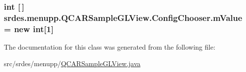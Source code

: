 \hypertarget{classsrdes_1_1menupp_1_1_q_c_a_r_sample_g_l_view_1_1_config_chooser_a6b3a613c507380ad15be00eb833800c9}{
\subsubsection[{m\-Value}]{\setlength{\rightskip}{0pt plus 5cm}int \mbox{[}$\,$\mbox{]} {\bf srdes.\-menupp.\-Q\-C\-A\-R\-Sample\-G\-L\-View.\-Config\-Chooser.\-m\-Value} = new int\mbox{[}1\mbox{]}}}\label{classsrdes_1_1menupp_1_1_q_c_a_r_sample_g_l_view_1_1_config_chooser_a6b3a613c507380ad15be00eb833800c9}


\-The documentation for this class was generated from the following file\-:\begin{DoxyCompactItemize}
\item 
src/srdes/menupp/\hyperlink{_q_c_a_r_sample_g_l_view_8java}{\-Q\-C\-A\-R\-Sample\-G\-L\-View.\-java}\end{DoxyCompactItemize}
